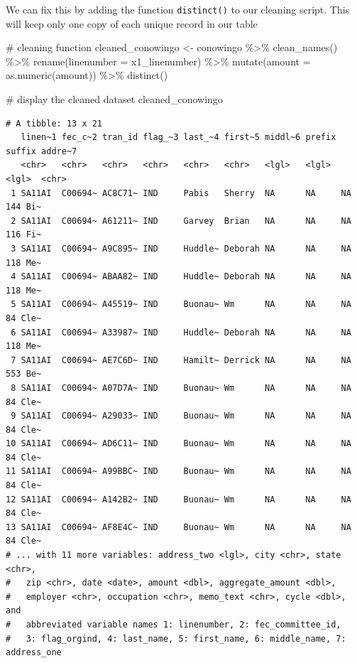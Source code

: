 \documentclass[
  letterpaper,
  DIV=11,
  numbers=noendperiod]{scrreprt}
\newenvironment{Shaded}{\begin{snugshade}}{\end{snugshade}}
\newcommand{\AttributeTok}[1]{\textcolor[rgb]{0.40,0.45,0.13}{#1}}
\newcommand{\CommentTok}[1]{\textcolor[rgb]{0.37,0.37,0.37}{#1}}
\newcommand{\FunctionTok}[1]{\textcolor[rgb]{0.28,0.35,0.67}{#1}}
\newcommand{\NormalTok}[1]{\textcolor[rgb]{0.00,0.23,0.31}{#1}}
\newcommand{\OtherTok}[1]{\textcolor[rgb]{0.00,0.23,0.31}{#1}}
\newcommand{\SpecialCharTok}[1]{\textcolor[rgb]{0.37,0.37,0.37}{#1}}
\begin{document}
We can fix this by adding the function \texttt{distinct()} to our
cleaning script. This will keep only one copy of each unique record in
our table

\begin{Shaded}
\begin{Highlighting}[]
\CommentTok{\# cleaning function}
\NormalTok{cleaned\_conowingo }\OtherTok{\textless{}{-}}\NormalTok{ conowingo }\SpecialCharTok{\%\textgreater{}\%}
  \FunctionTok{clean\_names}\NormalTok{() }\SpecialCharTok{\%\textgreater{}\%}
  \FunctionTok{rename}\NormalTok{(}\AttributeTok{linenumber =}\NormalTok{ x1\_linenumber) }\SpecialCharTok{\%\textgreater{}\%}
  \FunctionTok{mutate}\NormalTok{(}\AttributeTok{amount =} \FunctionTok{as.numeric}\NormalTok{(amount)) }\SpecialCharTok{\%\textgreater{}\%}
  \FunctionTok{distinct}\NormalTok{()}


\CommentTok{\# display the cleaned dataset}
\NormalTok{cleaned\_conowingo}
\end{Highlighting}
\end{Shaded}

\begin{verbatim}
# A tibble: 13 x 21
   linen~1 fec_c~2 tran_id flag_~3 last_~4 first~5 middl~6 prefix suffix addre~7
   <chr>   <chr>   <chr>   <chr>   <chr>   <chr>   <lgl>   <lgl>  <lgl>  <chr>  
 1 SA11AI  C00694~ AC8C71~ IND     Pabis   Sherry  NA      NA     NA     144 Bi~
 2 SA11AI  C00694~ A61211~ IND     Garvey  Brian   NA      NA     NA     116 Fi~
 3 SA11AI  C00694~ A9C895~ IND     Huddle~ Deborah NA      NA     NA     118 Me~
 4 SA11AI  C00694~ ABAA82~ IND     Huddle~ Deborah NA      NA     NA     118 Me~
 5 SA11AI  C00694~ A45519~ IND     Buonau~ Wm      NA      NA     NA     84 Cle~
 6 SA11AI  C00694~ A33987~ IND     Huddle~ Deborah NA      NA     NA     118 Me~
 7 SA11AI  C00694~ AE7C6D~ IND     Hamilt~ Derrick NA      NA     NA     553 Be~
 8 SA11AI  C00694~ A07D7A~ IND     Buonau~ Wm      NA      NA     NA     84 Cle~
 9 SA11AI  C00694~ A29033~ IND     Buonau~ Wm      NA      NA     NA     84 Cle~
10 SA11AI  C00694~ AD6C11~ IND     Buonau~ Wm      NA      NA     NA     84 Cle~
11 SA11AI  C00694~ A99BBC~ IND     Buonau~ Wm      NA      NA     NA     84 Cle~
12 SA11AI  C00694~ A142B2~ IND     Buonau~ Wm      NA      NA     NA     84 Cle~
13 SA11AI  C00694~ AF8E4C~ IND     Buonau~ Wm      NA      NA     NA     84 Cle~
# ... with 11 more variables: address_two <lgl>, city <chr>, state <chr>,
#   zip <chr>, date <date>, amount <dbl>, aggregate_amount <dbl>,
#   employer <chr>, occupation <chr>, memo_text <chr>, cycle <dbl>, and
#   abbreviated variable names 1: linenumber, 2: fec_committee_id,
#   3: flag_orgind, 4: last_name, 5: first_name, 6: middle_name, 7: address_one
\end{verbatim}
\end{document}
